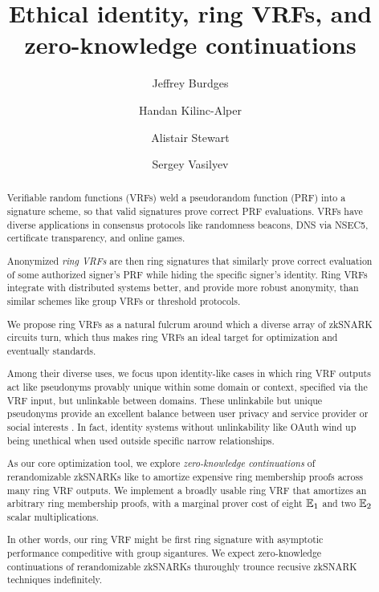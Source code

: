 \documentclass[runningheads,evcountsame,a4paper,11pt,orivec]{llncs}
\title{Ethical identity, ring VRFs, and zero-knowledge continuations}
\author{Jeffrey Burdges \and Handan Kilinc-Alper \and Alistair Stewart \and Sergey Vasilyev}
\date{}
\institute{Web 3.0 Foundation}
\begin{document}
	
\maketitle

\begin{abstract}
Verifiable random functions (VRFs) weld a pseudorandom function (PRF) into
a signature scheme, so that valid signatures prove correct PRF evaluations.
VRFs have diverse applications in consensus protocols like randomness
beacons, DNS via NSEC5, certificate transparency, and online games.

Anonymized {\em ring VRFs} are then ring signatures that similarly prove
correct evaluation of some authorized signer's PRF while hiding the
specific signer's identity.
Ring VRFs integrate with distributed systems better, and provide more robust
anonymity, than similar schemes like group VRFs or threshold protocols.


We propose ring VRFs as a natural fulcrum around which a diverse array of
zkSNARK circuits turn, which thus makes ring VRFs an ideal target
for optimization and eventually standards. 

%

Among their diverse uses, we focus upon identity-like cases in which
ring VRF outputs act like pseudonyms provably unique within some domain or
context, specified via the VRF input, but unlinkable between domains. 
These unlinkabile but unique pseudonyms provide an excellent balance between
user privacy and service provider or social interests \cite{pop2008}.
%
In fact, identity systems without unlinkability like OAuth wind up being
unethical when used outside specific narrow relationships.

%

As our core optimization tool, we explore {\em zero-knowledge continuations}
of rerandomizable zkSNARKs like \cite{groth16} to amortize expensive
ring membership proofs across many ring VRF outputs. 
%
We implement a broadly usable ring VRF that amortizes an arbitrary
ring membership proofs, with a marginal prover cost
 of eight ${\mathbb{E}}_1$ and two ${\mathbb{E}}_2$ scalar multiplications.

In other words, our ring VRF might be first ring signature with asymptotic
performance compeditive with group sigantures.
%
We expect zero-knowledge continuations of rerandomizable zkSNARKs
thuroughly trounce recusive zkSNARK techniques indefinitely.
\end{abstract}



% 













\end{document}
